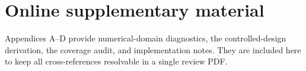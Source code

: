\section*{Online supplementary material}
\noindent Appendices A--D provide numerical-domain diagnostics, the controlled-design derivation, the coverage audit, and implementation notes. They are included here to keep all cross-references resolvable in a single review PDF.
\renewcommand{\theequation}{\thesection.\arabic{equation}}
\renewcommand{\thetable}{\thesection.\arabic{table}}
\renewcommand{\thefigure}{\thesection.\arabic{figure}}
\renewcommand{\theHequation}{\thesection.\arabic{equation}}
\renewcommand{\theHtable}{\thesection.\arabic{table}}
\renewcommand{\theHfigure}{\thesection.\arabic{figure}}





